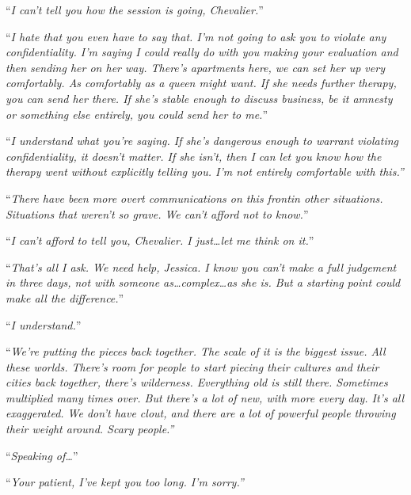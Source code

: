 ``\emph{I can't tell you how the session is going, Chevalier.}''



``\emph{I hate that you even have to say that.  I'm not going to ask you to violate any confidentiality.  I'm saying I could really do with you making your evaluation and then sending her on her way.  There's apartments here, we can set her up very comfortably.  As comfortably as a queen might want.  If she needs further therapy, you can send her there.  If she's stable enough to discuss business, be it amnesty or something else entirely, you could send her to me.}''



``\emph{I understand what you're saying.  If she's dangerous enough to warrant violating confidentiality, it doesn't matter.  If she isn't, then I can let you know how the therapy went without explicitly telling you.  I'm not entirely comfortable with this.''}



``\emph{There have been more overt communications on this front}\emph{in other situations.  Situations that weren't so grave.  We can't afford not to know.}''



``\emph{I can't afford to tell you, Chevalier.  I just\ldots let me think on it.}''



``\emph{That's all I ask.  We need help, Jessica.  I know you can't make a full judgement in three days, not with someone as\ldots complex\ldots as she is.  But a starting point could make all the difference.}''



``\emph{I understand.}''



``\emph{We're putting the pieces back together.  The scale of it is the biggest issue.  All these worlds.  There's room for people to start piecing their cultures and their cities back together, there's wilderness.  Everything old is still there.  Sometimes multiplied many times over.  But there's a lot of new, with more every day.  It's all exaggerated.  We don't have clout, and there are a lot of powerful people throwing their weight around.  Scary people.''}



``\emph{Speaking of\ldots}''



``\emph{Your patient, I've kept you too long.  I'm sorry.''}



